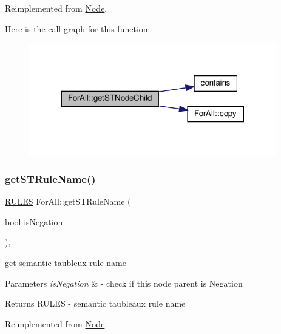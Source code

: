 Reimplemented from \hyperlink{class_node_a1009cb6d84206c2b5eaa86580da59a7c}{Node}.

Here is the call graph for this function\+:\nopagebreak
\begin{figure}[H]
\begin{center}
\leavevmode
\includegraphics[width=305pt]{d8/dc5/class_for_all_a847b6ce62d4e04ce7487b2cc1b49164f_cgraph}
\end{center}
\end{figure}
\mbox{\label{class_for_all_a97e03dcd8f51824fe629487847b7c4dc}} 
\subsubsection{\texorpdfstring{get\+S\+T\+Rule\+Name()}{getSTRuleName()}}
{\footnotesize\ttfamily \hyperlink{proposition_2tableaux_2enum_8h_a70c93904c6a27d228050f922eb4fc3b8}{R\+U\+L\+ES} For\+All\+::get\+S\+T\+Rule\+Name (\begin{DoxyParamCaption}\item[{bool}]{is\+Negation }\end{DoxyParamCaption})\hspace{0.3cm}{\ttfamily [override]}, {\ttfamily [virtual]}}



get semantic taubleux rule name 


\begin{DoxyParams}{Parameters}
{\em is\+Negation} & -\/ check if this node parent is Negation \\
\hline
\end{DoxyParams}
\begin{DoxyReturn}{Returns}
R\+U\+L\+ES -\/ semantic taubleaux rule name 
\end{DoxyReturn}


Reimplemented from \hyperlink{class_node_a25b6581950988c2536a392a6874c8072}{Node}.

